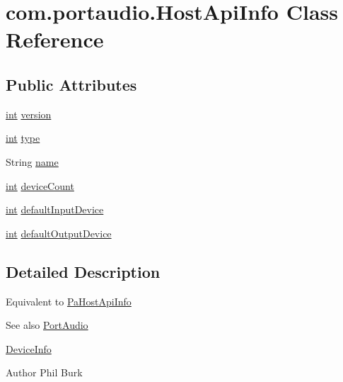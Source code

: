 \hypertarget{classcom_1_1portaudio_1_1_host_api_info}{}\section{com.\+portaudio.\+Host\+Api\+Info Class Reference}
\label{classcom_1_1portaudio_1_1_host_api_info}
\subsection*{Public Attributes}
\begin{DoxyCompactItemize}
\item 
\hyperlink{xmltok_8h_a5a0d4a5641ce434f1d23533f2b2e6653}{int} \hyperlink{classcom_1_1portaudio_1_1_host_api_info_aa80dc8284f00dea7970ff20773f4bef4}{version}
\item 
\hyperlink{xmltok_8h_a5a0d4a5641ce434f1d23533f2b2e6653}{int} \hyperlink{classcom_1_1portaudio_1_1_host_api_info_a78cd3098a8ea7feca979e754b48a2c4e}{type}
\item 
String \hyperlink{classcom_1_1portaudio_1_1_host_api_info_a8bc5a168bf5fab5ac8c18e8f15471d9a}{name}
\item 
\hyperlink{xmltok_8h_a5a0d4a5641ce434f1d23533f2b2e6653}{int} \hyperlink{classcom_1_1portaudio_1_1_host_api_info_a81c1f3b0678e3f6820ae9a4b77f55a13}{device\+Count}
\item 
\hyperlink{xmltok_8h_a5a0d4a5641ce434f1d23533f2b2e6653}{int} \hyperlink{classcom_1_1portaudio_1_1_host_api_info_a3027205deb4fb9496144ddd59ee5b777}{default\+Input\+Device}
\item 
\hyperlink{xmltok_8h_a5a0d4a5641ce434f1d23533f2b2e6653}{int} \hyperlink{classcom_1_1portaudio_1_1_host_api_info_a2cd75a584de461099ad6f1bbcb620216}{default\+Output\+Device}
\end{DoxyCompactItemize}


\subsection{Detailed Description}
Equivalent to \hyperlink{struct_pa_host_api_info}{Pa\+Host\+Api\+Info} \begin{DoxySeeAlso}{See also}
\hyperlink{classcom_1_1portaudio_1_1_port_audio}{Port\+Audio} 

\hyperlink{classcom_1_1portaudio_1_1_device_info}{Device\+Info} 
\end{DoxySeeAlso}
\begin{DoxyAuthor}{Author}
Phil Burk 
\end{DoxyAuthor}


